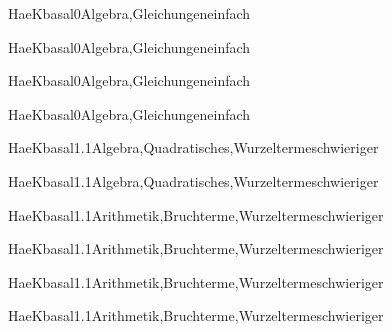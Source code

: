 \documentclass[12pt]{article}
\begin{document}
\begin{Add}{HaeK}{basal0}{Algebra,Gleichungen}{einfach}
\solution{ }
\end{Add}
\begin{Add}{HaeK}{basal0}{Algebra,Gleichungen}{einfach}
\end{Add}

\begin{Add}{HaeK}{basal0}{Algebra,Gleichungen}{einfach}
\solution{ }
\end{Add}
\begin{Add}{HaeK}{basal0}{Algebra,Gleichungen}{einfach}
\end{Add}

\begin{Add}{HaeK}{basal1.1}{Algebra,Quadratisches,Wurzelterme}{schwieriger}
\solution{ }
\end{Add}
\begin{Add}{HaeK}{basal1.1}{Algebra,Quadratisches,Wurzelterme}{schwieriger}
\end{Add}

\begin{Add}{HaeK}{basal1.1}{Arithmetik,Bruchterme,Wurzelterme}{schwieriger}
\solution{ }
\end{Add}
\begin{Add}{HaeK}{basal1.1}{Arithmetik,Bruchterme,Wurzelterme}{schwieriger}
\end{Add}

\begin{Add}{HaeK}{basal1.1}{Arithmetik,Bruchterme,Wurzelterme}{schwieriger}
\solution{ }
\end{Add}
\begin{Add}{HaeK}{basal1.1}{Arithmetik,Bruchterme,Wurzelterme}{schwieriger}
\end{Add}
\end{document}
